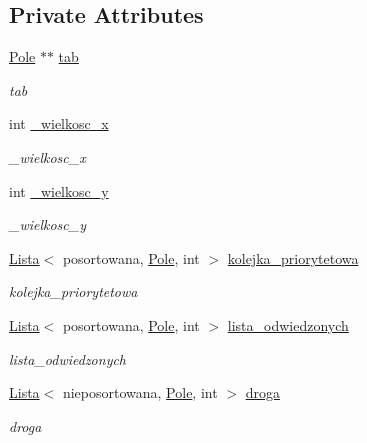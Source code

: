 \subsection*{Private Attributes}
\begin{DoxyCompactItemize}
\item 
\hyperlink{class_pole}{Pole} $\ast$$\ast$ \hyperlink{class_plansza_abe1ebd55bf2c57ab4294c93ade95fb58}{tab}
\begin{DoxyCompactList}\small\item\em tab \end{DoxyCompactList}\item 
int \hyperlink{class_plansza_a5e6dc8845d0d3f1c9b7457e342971b4b}{\+\_\+wielkosc\+\_\+x}
\begin{DoxyCompactList}\small\item\em \+\_\+wielkosc\+\_\+x \end{DoxyCompactList}\item 
int \hyperlink{class_plansza_a8f896782ff5b9322070dc0fcc6f8efa0}{\+\_\+wielkosc\+\_\+y}
\begin{DoxyCompactList}\small\item\em \+\_\+wielkosc\+\_\+y \end{DoxyCompactList}\item 
\hyperlink{class_lista}{Lista}$<$ posortowana, \hyperlink{class_pole}{Pole}, int $>$ \hyperlink{class_plansza_abe25940912409371c0cdfbf3547b5626}{kolejka\+\_\+priorytetowa}
\begin{DoxyCompactList}\small\item\em kolejka\+\_\+priorytetowa \end{DoxyCompactList}\item 
\hyperlink{class_lista}{Lista}$<$ posortowana, \hyperlink{class_pole}{Pole}, int $>$ \hyperlink{class_plansza_a49598690b46b9ef9c80761f77ef3a7e4}{lista\+\_\+odwiedzonych}
\begin{DoxyCompactList}\small\item\em lista\+\_\+odwiedzonych \end{DoxyCompactList}\item 
\hyperlink{class_lista}{Lista}$<$ nieposortowana, \hyperlink{class_pole}{Pole}, int $>$ \hyperlink{class_plansza_aec2526e5fde2763eb9f2447e0830c1cb}{droga}
\begin{DoxyCompactList}\small\item\em droga \end{DoxyCompactList}\end{DoxyCompactItemize}


